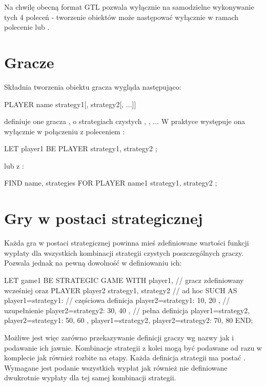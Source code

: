 \documentclass[polish]{standalone}
\begin{document}
Na chwilę obecną format GTL pozwala wyłącznie na samodzielne wykonywanie tych 4 poleceń - tworzenie obiektów może 
następować wyłącznie w ramach polecenie  lub .

\section{Gracze}

Składnia tworzenia obiektu gracza wygląda następująco:

\begin{code}
PLAYER name { strategy1[, strategy2[, ...]] }
\end{code}

definiuje one gracza , o strategiach czystych , , ... W praktyce występuje
ona wyłącznie w połączeniu z poleceniem :

\begin{code}
LET player1 BE PLAYER { strategy1, strategy2 };
\end{code}

lub z :

\begin{code}
FIND name, strategies
 FOR PLAYER name1 { strategy1, strategy2 };
\end{code}

\section{Gry w postaci strategicznej}

Każda gra w postaci strategicznej powinna mieś zdefiniowane wartości funkcji wypłaty dla wszystkich kombinacji strategii
czystych poszczególnych graczy. Pozwala jednak na pewną dowolność w definiowaniu ich:

\begin{code}
LET game1 BE
  STRATEGIC GAME
  WITH
    player1, // gracz zdefiniowany wcześniej oraz
    PLAYER player2 { strategy1, strategy2 } // ad hoc
  SUCH AS
    { player1=strategy1: // częściowa definicja
     { player2=strategy1: 10, 20 }, // uzupełnienie
     { player2=strategy2: 30, 40 }
    },
    // pełna definicja
    { player1=strategy2, player2=strategy1: 50, 60 },
    { player1=strategy2, player2=strategy2: 70, 80 }
  END;
\end{code}

Możliwe jest więc zarówno przekazywanie definicji graczy wg nazwy jak i podawanie ich jawnie. Kombinacje strategii z
kolei mogą być podawane od razu w komplecie jak również rozbite na etapy. Każda definicja strategii ma postać
. Wymagane jest podanie
wszystkich wypłat jak również nie definiowane dwukrotnie wypłaty dla tej samej kombinacji strategii.
\end{document}
